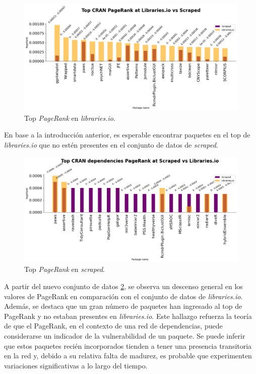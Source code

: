 \begin{figure}[h!]
    \begin{center}
        \includegraphics[width=1\textwidth]{img/cran/pr_top.png}
        \caption{Top \textit{PageRank} en \textit{libraries.io}.}
        \label{fig:cran_pr_libio_top}
    \end{center}
\end{figure}



En base a la introducción anterior, es esperable encontrar paquetes en el top de \textit{libraries.io}
que no estén presentes en el conjunto de datos de \textit{scraped}.

\begin{figure}[h!]
    \begin{center}
        \includegraphics[width=1\textwidth]{img/cran/pr_top2.png}
        \caption{Top \textit{PageRank} en \textit{scraped}.}
        \label{fig:cran_pr_scraped_top}
    \end{center}
\end{figure}

A partir del nuevo conjunto de datos \ref{fig:cran_pr_scraped_top}, se observa un descenso general en los
valores de PageRank en comparación con el conjunto de datos de \textit{libraries.io}. Además, se destaca
que un gran número de paquetes han ingresado al top de PageRank y no estaban presentes en \textit{libraries.io}.
Este hallazgo refuerza la teoría de que el PageRank, en el contexto de una red de dependencias, puede
considerarse un indicador de la vulnerabilidad de un paquete. Se puede inferir que estos paquetes recién
incorporados tienden a tener una presencia transitoria en la red y, debido a su relativa falta de madurez,
es probable que experimenten variaciones significativas a lo largo del tiempo.

